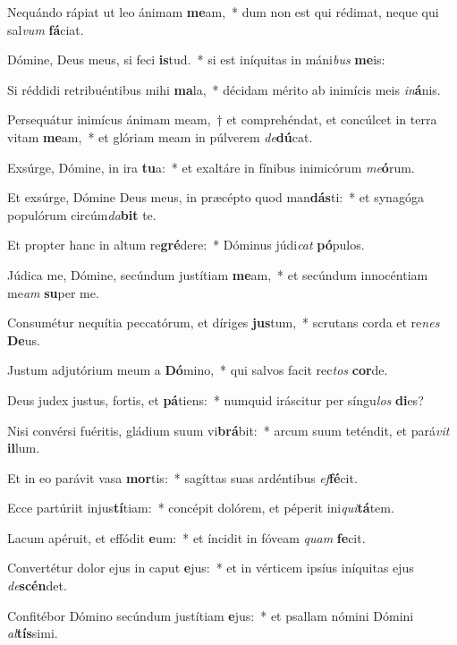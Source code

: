 \item Nequándo rápiat ut leo ánimam \textbf{me}am,~* dum non est qui rédimat, neque qui sal\textit{vum} \textbf{fá}ciat.
\item Dómine, Deus meus, si feci \textbf{is}tud.~* si est iníquitas in máni\textit{bus} \textbf{me}is:
\item Si réddidi retribuéntibus mihi \textbf{ma}la,~* décidam mérito ab inimícis meis \textit{in}\textbf{á}nis.
\item Persequátur inimícus ánimam meam,~† et comprehéndat, et concúlcet in terra vitam \textbf{me}am,~* et glóriam meam in púlverem \textit{de}\textbf{dú}cat.
\item Exsúrge, Dómine, in ira \textbf{tu}a:~* et exaltáre in fínibus inimicórum \textit{me}\textbf{ó}rum.
\item Et exsúrge, Dómine Deus meus, in præcépto quod man\textbf{dás}ti:~* et synagóga populórum circúm\textit{da}\textbf{bit} te.
\item Et propter hanc in altum re\textbf{gré}dere:~* Dóminus júdi\textit{cat} \textbf{pó}pulos.
\item Júdica me, Dómine, secúndum justítiam \textbf{me}am,~* et secúndum innocéntiam me\textit{am} \textbf{su}per me.
\item Consumétur nequítia peccatórum, et díriges \textbf{jus}tum,~* scrutans corda et re\textit{nes} \textbf{De}us.
\item Justum adjutórium meum a \textbf{Dó}mino,~* qui salvos facit rec\textit{tos} \textbf{cor}de.
\item Deus judex justus, fortis, et \textbf{pá}tiens:~* numquid iráscitur per síngu\textit{los} \textbf{di}es?
\item Nisi convérsi fuéritis, gládium suum vi\textbf{brá}bit:~* arcum suum teténdit, et pará\textit{vit} \textbf{il}lum.
\item Et in eo parávit vasa \textbf{mor}tis:~* sagíttas suas ardéntibus \textit{ef}\textbf{fé}cit.
\item Ecce partúriit injus\textbf{tí}tiam:~* concépit dolórem, et péperit ini\textit{qui}\textbf{tá}tem.
\item Lacum apéruit, et effódit \textbf{e}um:~* et íncidit in fóveam \textit{quam} \textbf{fe}cit.
\item Convertétur dolor ejus in caput \textbf{e}jus:~* et in vérticem ipsíus iníquitas ejus \textit{de}\textbf{scén}det.
\item Confitébor Dómino secúndum justítiam \textbf{e}jus:~* et psallam nómini Dómini \textit{al}\textbf{tís}simi.
